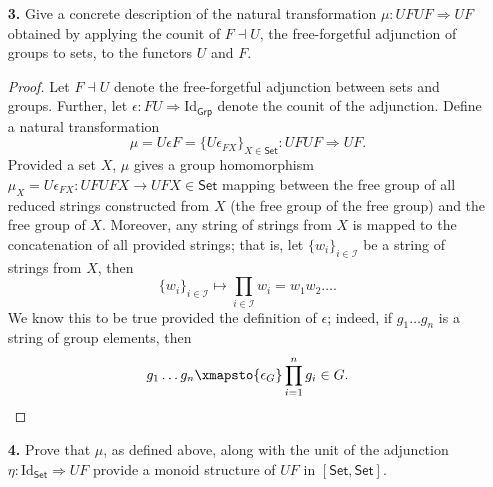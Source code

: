 \documentclass[ 12pt ]{article}
\begin{document}
\begin{enumerate}
	\item[\textbf{3.}] Give a concrete description of the natural transformation $\mu : UFUF \Rightarrow UF$ obtained by applying the counit of $F \dashv U$, the free-forgetful adjunction of groups to sets, to the functors $U$ and $F$.

		\begin{proof}
			Let $F \dashv U$ denote the free-forgetful adjunction between sets and groups. Further, let $\epsilon : FU \Rightarrow \mathrm{Id}_\mathsf{Grp}$ denote the counit of the adjunction. Define a natural transformation $$\mu = U \epsilon F = \{ U \epsilon_{FX} \}_{X \in \mathsf{Set}} : UFUF \Rightarrow UF.$$ Provided a set $X$, $\mu$ gives a group homomorphism $\mu_X = U \epsilon_{FX} : UFUFX \to UFX \in \mathsf{Set}$ mapping between the free group of all reduced strings constructed from $X$ (the free group of the free group) and the free group of $X$. Moreover, any string of strings from $X$ is mapped to the concatenation of all provided strings; that is, let $\{ w_i \}_{i \in \mathscr{I}}$ be a string of strings from $X$, then $$\{ w_i \}_{i \in \mathscr{I}} \longmapsto \prod_{i \in \mathscr{I}} w_i = w_1 w_2 \hdots.$$ We know this to be true provided the definition of $\epsilon$; indeed, if $g_1 \hdots g_n$ is a string of group elements, then $$g_1 \hdots g_n \xmapsto{\epsilon_G} \prod_{i = 1}^n g_i \in G.$$
		\end{proof}


	\item[\textbf{4.}] Prove that $\mu$, as defined above, along with the unit of the adjunction $\eta : \mathrm{Id}_\mathsf{Set} \Rightarrow UF$ provide a monoid structure of $UF$ in $[\mathsf{Set}, \mathsf{Set}]$.


\end{enumerate}
\end{document}
